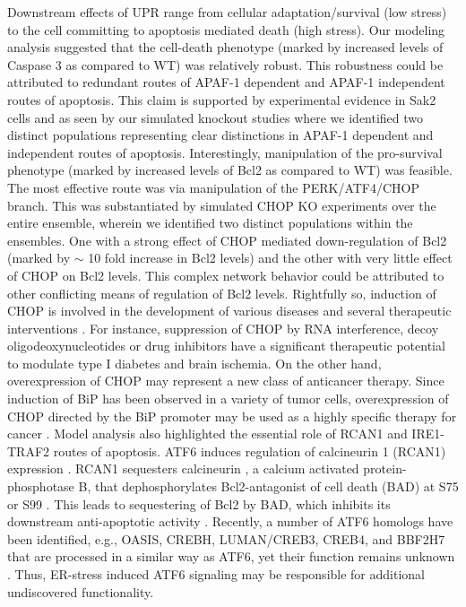 \documentclass[fleqn,10pt]{wlscirep}
\begin{document}
Downstream effects of UPR range from cellular adaptation/survival (low stress) to the cell committing to apoptosis mediated death (high stress). Our modeling analysis suggested that the cell-death phenotype (marked by increased levels of Caspase 3 as compared to WT) was relatively robust. This robustness could be attributed to redundant routes of APAF-1 dependent and APAF-1 independent routes of apoptosis. This claim is supported by experimental evidence in Sak2 cells \cite{rao2002cer} and as seen by our simulated knockout studies where we identified two distinct populations representing clear distinctions in APAF-1 dependent and independent routes of apoptosis. Interestingly, manipulation of the pro-survival phenotype (marked by increased levels of Bcl2 as compared to WT) was feasible. The most effective route was via manipulation of the PERK/ATF4/CHOP branch. This was substantiated by simulated CHOP KO experiments over the entire ensemble, wherein we identified two distinct populations within the ensembles. One with a strong effect of CHOP mediated down-regulation of Bcl2 (marked by $\sim$ 10 fold increase in Bcl2 levels) and the other with very little effect of CHOP on Bcl2 levels. This complex network behavior could be attributed to other conflicting means of regulation of Bcl2 levels. Rightfully so, induction of CHOP is involved in the development of various diseases and several therapeutic interventions \cite{oyadomari2003rcg}. For instance, suppression of CHOP by RNA interference, decoy oligodeoxynucleotides or drug inhibitors have a significant therapeutic potential to modulate type I diabetes and brain ischemia. On the other hand, overexpression of CHOP may represent a new class of anticancer therapy. Since induction of BiP has been observed in a variety of tumor cells, overexpression of CHOP directed by the BiP promoter may be used as a highly specific therapy for cancer \cite{oyadomari2003rcg}. Model analysis also highlighted the essential role of RCAN1 and IRE1-TRAF2 routes of apoptosis. ATF6 induces regulation of calcineurin 1 (RCAN1) expression \cite{belmont2008cga}. RCAN1 sequesters calcineurin \cite{belmont2008cga}, a calcium activated protein-phosphotase B, that dephosphorylates Bcl2-antagonist of cell death (BAD) at S75 or S99 \cite{wang1999cia}. This leads to sequestering of Bcl2 by BAD, which inhibits its downstream anti-apoptotic activity \cite{wang1999cia}. Recently, a number of ATF6 homologs have been identified, e.g., OASIS, CREBH, LUMAN/CREB3, CREB4, and BBF2H7 that are processed in a similar way as ATF6, yet their function remains unknown \cite{Ron:2007rq}. Thus, ER-stress induced ATF6 signaling may be responsible for additional undiscovered functionality. 
\end{document}
